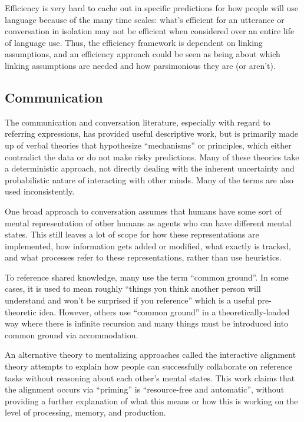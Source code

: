 \documentclass[]{article}
\begin{document}
Efficiency is very hard to cache out in specific predictions for how people will use language because of the many time scales: what's efficient for an utterance or conversation in isolation may not be efficient when considered over an entire life of language use. Thus, the efficiency framework is dependent on linking assumptions, and an efficiency approach could be seen as being about which linking assumptions are needed and how parsimonious they are (or aren't). 


\subsection{Communication}
The communication and conversation literature, especially with regard to referring expressions, has provided useful descriptive work, but is primarily made up of verbal theories that  hypothesize ``mechanisms'' or principles, which either contradict the data or do not make risky predictions. Many of these theories take a deterministic approach, not directly dealing with the inherent uncertainty and probabilistic nature of interacting with other minds. Many of the terms are also used inconsistently. 

One broad approach to conversation assumes that humans have some sort of mental representation of other humans as agents who can have different mental states. This still leaves a lot of scope for how these representations are implemented, how information gets added or modified, what exactly is tracked, and what processes refer to these representations, rather than use heuristics. 

To reference shared knowledge, many use the term ``common ground''. In some cases, it is used to mean roughly ``things you think another person will understand and won't be surprised if you reference'' which is a useful pre-theoretic idea. However, others use ``common ground'' in a theoretically-loaded way where there is infinite recursion and many things must be introduced into common ground via accommodation. 

An alternative theory to mentalizing approaches called the interactive alignment theory attempts to explain how people can successfully collaborate on reference tasks without reasoning about each other's mental states. This work claims that the alignment occurs via ``priming'' is ``resource-free and automatic'', without providing a further explanation of what this means or how this is working on the level of processing, memory, and production. 
\end{document}
